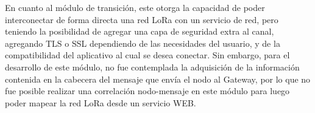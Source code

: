 \begin{justify}
En cuanto al módulo de transición, este otorga la capacidad de poder interconectar de forma directa una red LoRa con un servicio de red, pero teniendo la posibilidad de agregar una capa de seguridad extra al canal, agregando TLS o SSL dependiendo de las necesidades del usuario, y de la compatibilidad del aplicativo al cual se desea conectar. Sin embargo, para el desarrollo de este módulo, no fue contemplada la adquisición de la información contenida en la cabecera del mensaje que envía el nodo al Gateway, por lo que no fue posible realizar una correlación nodo-mensaje en este módulo para luego poder mapear la red LoRa desde un servicio WEB.
\end{justify}
